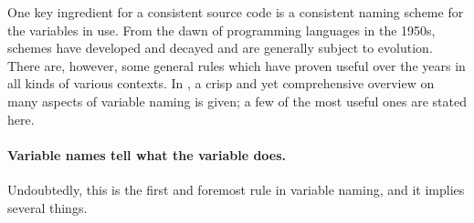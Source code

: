 One key ingredient for a consistent source code is a consistent naming scheme
for the variables in use. From the dawn of programming languages in the 1950s,
schemes have developed and decayed and are generally subject to evolution.
There are, however, some general rules which have proven useful over the years
in all kinds of various contexts. In \cite{Johnson:2002:MPS}, a crisp and yet
comprehensive overview on many aspects of variable naming is given; a few of
the most useful ones are stated here.

\paragraph{Variable names tell what the variable does.}
Undoubtedly, this is the first and foremost rule in variable naming, and it
implies several things.

